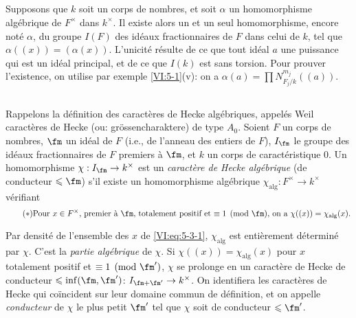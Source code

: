 \subsection{}\label{VI:5-2}

Supposons que $k$ soit un corps de nombres, et soit $\alpha$ un homomorphisme 
alg\'ebrique de $F^\times$ dans $k^\times$. Il existe alors un et un seul 
homomorphisme, encore not\'e $\alpha$, du groupe $I(F)$ des id\'eaux 
fractionnaires de $F$ dans celui de $k$, tel que $\alpha((x))=(\alpha(x))$. 
L'unicit\'e r\'esulte de ce que tout id\'eal $a$ une puissance qui est un 
id\'eal principal, et de ce que $I(k)$ est sans torsion. Pour prouver 
l'existence, on utilise par exemple \ref{VI:5-1}(v): on a 
$\alpha(a) = \prod N_{F_j/k}^{m_j}((a))$. 





\subsection{}\label{VI:5-3}

Rappelons la d\'efinition des caract\`eres de Hecke alg\'ebriques, appel\'es 
Weil caract\`eres de Hecke (ou: gr\"ossencharaktere) de type $A_0$. Soient $F$ 
un corps de nombres, $\fm$ un id\'eal de $F$ (i.e., de l'anneau des entiers de 
$F$), $I_\fm$ le groupe des id\'eaux fractionnaires de $F$ premiers \`a $\fm$, 
et $k$ un corps de caract\'eristique $0$. Un homomorphisme 
$\chi:I_\fm \to k^\times$ est un \emph{caract\`ere de Hecke alg\'ebrique} (de 
conducteur $\leqslant \fm$) s'il existe un homomorphisme alg\'ebrique 
$\chi_\text{alg}:F^\times \to k^\times$ v\'erifiant 
\begin{equation*}\tag{$*$}\label{VI:eq:5-3-1}
\text{Pour $x\in F^\times$, premier \`a $\fm$, totalement positif et 
$\equiv 1\pmod\fm$, on a $\chi((x))=\chi_\text{alg}(x)$.}
\end{equation*}

Par densit\'e de l'ensemble des $x$ de \eqref{VI:eq:5-3-1}, $\chi_\text{alg}$ 
est enti\`erement d\'etermin\'e par $\chi$. C'est la \emph{partie alg\'ebrique} 
de $\chi$. Si $\chi((x))=\chi_\text{alg}(x)$ pour $x$ totalement positif et 
$\equiv 1\pmod{\fm'}$, $\chi$ se prolonge en un caract\`ere de Hecke de 
conducteur $\leqslant \inf(\fm,\fm')$: $I_{\fm+\fm'}\to k^\times$. On 
identifiera les caract\`eres de Hecke qui coïncident sur leur domaine commun de 
d\'efinition, et on appelle \emph{conducteur} de $\chi$ le plus petit $\fm'$ 
tel que $\chi$ soit de conducteur $\leqslant \fm'$. 





